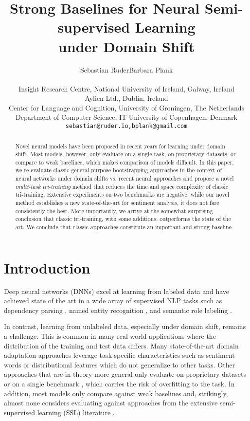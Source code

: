 \documentclass[11pt,a4paper]{article}
\title{Strong Baselines for Neural Semi-supervised Learning\\under Domain Shift}
\author
{
	\begin{tabular}{cc}
	Sebastian Ruder & Barbara Plank \\
	\end{tabular}
	\\
    Insight Research Centre, National University of Ireland, Galway, Ireland\\
    Aylien Ltd., Dublin, Ireland\\
    Center for Language and Cognition, University of Groningen, The Netherlands\\
    Department of Computer Science, IT University of Copenhagen, Denmark\\
	{\tt \small{sebastian@ruder.io,bplank@gmail.com}}
}
\date{}
\begin{document}
\maketitle
\begin{abstract}
Novel neural models have been proposed in recent years for learning under domain shift. Most models, however, only evaluate on a single task, on proprietary datasets, or compare to weak baselines, which makes comparison of models difficult. 
In this paper, we re-evaluate classic general-purpose bootstrapping approaches in the context of neural networks under domain shifts vs. recent neural approaches
and propose a novel \emph{multi-task tri-training} method that reduces the time and space complexity of classic tri-training.
Extensive experiments on two benchmarks 
are negative: while our novel method establishes a new state-of-the-art for sentiment analysis, it does not fare consistently the best. More importantly, we arrive at the somewhat surprising conclusion that classic tri-training, with some additions, outperforms the state of the art. We conclude that classic approaches constitute an important and strong baseline.
\end{abstract}

\section{Introduction}

Deep neural networks (DNNs) excel at learning from labeled data and have achieved state of the art in a wide array of supervised NLP tasks such as dependency parsing \cite{Dozat2017}, named entity recognition \cite{Lample2016}, and semantic role labeling \cite{He2017}.

In contrast, learning from unlabeled data, especially under domain shift, remains a challenge. This is common in many real-world applications where the distribution of the training and test data differs. Many state-of-the-art domain adaptation approaches leverage task-specific characteristics such as sentiment words \cite{Blitzer2006,Wu2016a} or distributional features \cite{Schnabel2014,yin-schnabel-schutze:2015:EMNLP} which do not generalize to other tasks. Other approaches that are in theory more general only evaluate on proprietary datasets \cite{Kim2017b} or on a single benchmark \cite{Zhou2016}, which carries the risk of overfitting to the task. In addition, most models only compare against weak baselines and, strikingly, almost none considers evaluating against approaches from the extensive semi-supervised learning (SSL) literature \cite{Chapelle2006}.
\end{document}
